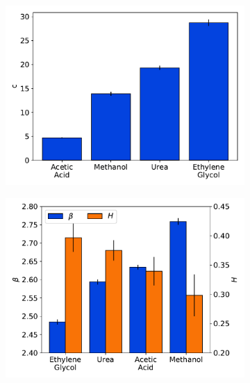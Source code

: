 \documentclass{article}
\begin{document}
\begin{figure}
  \begin{subfigure}{0.475\textwidth}
  \includegraphics[width=\textwidth]{c_parameters.pdf}
  \caption{}\label{fig:c_parameters}
  \end{subfigure}
  \begin{subfigure}{0.475\textwidth}
  \includegraphics[width=\textwidth]{beta_parameters.pdf}
  \caption{}\label{fig:beta_parameters}
  \end{subfigure}

\end{figure}
\end{document}
